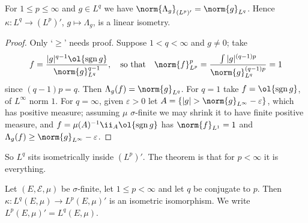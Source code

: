 \documentclass[a4paper]{scrartcl}
\DeclareMathOperator{\sgn}{sgn}
\begin{document}
\begin{lemma}\label{lem:isometricdual}
	For $1 \le p \le \infty$ and $g \in L^q$ we have $\norm{\Lambda_g}_{(L^p)'} = \norm{g}_{L^q}$. Hence $\kappa : L^q \to (L^p)'$, $g \mapsto \Lambda_g$, is a linear isometry.
\end{lemma}

\begin{proof}
	Only `$\ge$' needs proof. Suppose $1 < q < \infty$ and $g \ne 0$; take
	$$f = \frac{|g|^{q-1}\ol{\sgn g}}{\norm{g}_{L^q}^{q-1}}, \quad \text{so that} \quad \norm{f}_{L^p}^p = \frac{\int |g|^{(q-1)p}}{\norm{g}^{(q-1)p}_{L^q}} = 1$$
	since $(q-1)p = q$. Then $\Lambda_g(f) = \norm{g}_{L^q}$. For $q = 1$ take $f = \ol{\sgn g}$, of $L^\infty$ norm $1$. For $q = \infty$, given $\varepsilon > 0$ let $A = \{|g| > \norm{g}_{L^\infty} - \varepsilon\}$, which has positive measure; assuming $\mu$ $\sigma$-finite we may shrink it to have finite positive measure, and $f = \mu(A)^{-1}\ii_A \ol{\sgn g}$ has $\norm{f}_{L^1} = 1$ and $\Lambda_g(f) \ge \norm{g}_{L^\infty}-\varepsilon$.
\end{proof}

So $L^q$ sits isometrically inside $(L^p)'$. The theorem is that for $p < \infty$ it is everything.

\begin{theorem}\label{thm:lpdual}
	Let $(E, \mathcal{E},\mu)$ be $\sigma$-finite, let $1 \le p < \infty$ and let $q$ be conjugate to $p$. Then $\kappa : L^q(E,\mu) \to L^p(E,\mu)'$ is an isometric isomorphism. We write $L^p(E,\mu)' = L^q(E,\mu)$.
\end{theorem}
\end{document}
